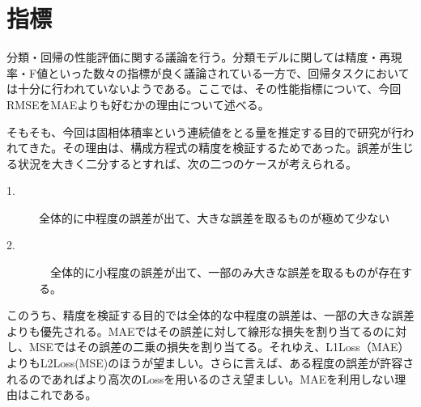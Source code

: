 \documentclass[uplatex]{suribt}
\begin{document}
\section{指標}
分類・回帰の性能評価に関する議論を行う。分類モデルに関しては精度・再現率・F値といった数々の指標が良く議論されている一方で、回帰タスクにおいては十分に行われていないようである。ここでは、その性能指標について、今回RMSEをMAEよりも好むかの理由について述べる。\par
そもそも、今回は固相体積率という連続値をとる量を推定する目的で研究が行われてきた。その理由は、構成方程式の精度を検証するためであった。誤差が生じる状況を大きく二分するとすれば、次の二つのケースが考えられる。
\begin{description}
    \item[1.] 全体的に中程度の誤差が出て、大きな誤差を取るものが極めて少ない
    \item[2.]　全体的に小程度の誤差が出て、一部のみ大きな誤差を取るものが存在する。
\end{description}
このうち、精度を検証する目的では全体的な中程度の誤差は、一部の大きな誤差よりも優先される。MAEではその誤差に対して線形な損失を割り当てるのに対し、MSEではその誤差の二乗の損失を割り当てる。それゆえ、L1Loss（MAE）よりもL2Loss(MSE)のほうが望ましい。さらに言えば、ある程度の誤差が許容されるのであればより高次のLossを用いるのさえ望ましい。MAEを利用しない理由はこれである。
\end{document}
